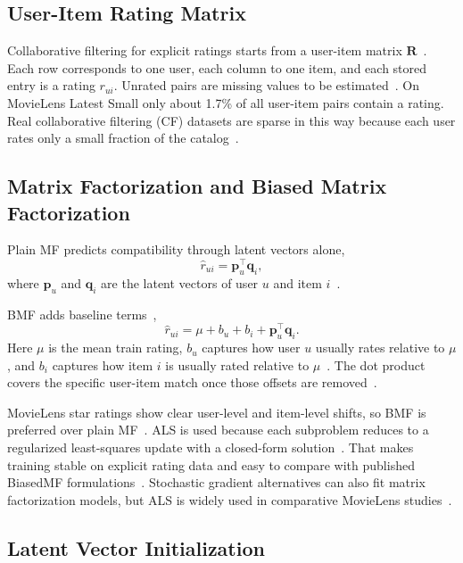 \documentclass[conference]{IEEEtran}
\begin{document}
\subsection{User-Item Rating Matrix}

Collaborative filtering for explicit ratings starts from a user-item matrix $\mathbf{R}$~\cite{ref3,ref4}. Each row corresponds to one user, each column to one item, and each stored entry is a rating $r_{ui}$. Unrated pairs are missing values to be estimated~\cite{ref3,ref4}. On MovieLens Latest Small only about 1.7\% of all user-item pairs contain a rating. Real collaborative filtering (CF) datasets are sparse in this way because each user rates only a small fraction of the catalog~\cite{ref2,ref3}.

\subsection{Matrix Factorization and Biased Matrix Factorization}

Plain MF predicts compatibility through latent vectors alone,
\begin{equation}
\hat{r}_{ui} = \mathbf{p}_u^\top \mathbf{q}_i,
\end{equation}
where $\mathbf{p}_u$ and $\mathbf{q}_i$ are the latent vectors of user $u$ and item $i$~\cite{ref3,ref6}.

BMF adds baseline terms~\cite{ref2,ref4,ref5},
\begin{equation}
\hat{r}_{ui} = \mu + b_u + b_i + \mathbf{p}_u^\top \mathbf{q}_i.
\end{equation}
Here $\mu$ is the mean train rating, $b_u$ captures how user $u$ usually rates relative to $\mu$, and $b_i$ captures how item $i$ is usually rated relative to $\mu$~\cite{ref2,ref3}. The dot product covers the specific user-item match once those offsets are removed~\cite{ref3,ref6}.

MovieLens star ratings show clear user-level and item-level shifts, so BMF is preferred over plain MF~\cite{ref1,ref2}. ALS is used because each subproblem reduces to a regularized least-squares update with a closed-form solution~\cite{ref1}. That makes training stable on explicit rating data and easy to compare with published BiasedMF formulations~\cite{ref1,ref2}. Stochastic gradient alternatives can also fit matrix factorization models, but ALS is widely used in comparative MovieLens studies~\cite{ref1,ref2}.

\subsection{Latent Vector Initialization}
\end{document}
